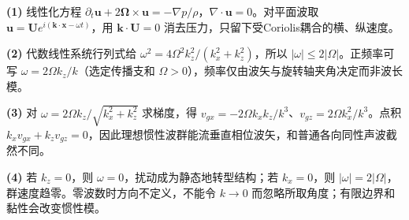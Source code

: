 \par\noindent\textbf{(1)} 线性化方程 \(\partial_t\boldsymbol u+2\boldsymbol\Omega\times\boldsymbol u=-\nabla p/\rho\)，\(\nabla\cdot\boldsymbol u=0\)。对平面波取 \(\boldsymbol u=\boldsymbol Ue^{i(\boldsymbol k\cdot\boldsymbol x-\omega t)}\)，用 \(\boldsymbol k\cdot\boldsymbol U=0\) 消去压力，只留下受Coriolis耦合的横、纵速度。
\par\noindent\textbf{(2)} 代数线性系统行列式给 \(\omega^2=4\Omega^2k_z^2/(k_x^2+k_z^2)\)，所以 \(|\omega|\le2|\Omega|\)。正频率可写 \(\omega=2\Omega k_z/k\)（选定传播支和 \(\Omega>0\)），频率仅由波矢与旋转轴夹角决定而非波长模。
\par\noindent\textbf{(3)} 对 \(\omega=2\Omega k_z/\sqrt{k_x^2+k_z^2}\) 求梯度，得 \(v_{gx}=-2\Omega k_xk_z/k^3\)、\(v_{gz}=2\Omega k_x^2/k^3\)。点积 \(k_xv_{gx}+k_zv_{gz}=0\)，因此理想惯性波群能流垂直相位波矢，和普通各向同性声波截然不同。
\par\noindent\textbf{(4)} 若 \(k_z=0\)，则 \(\omega=0\)，扰动成为静态地转型结构；若 \(k_x=0\)，则 \(|\omega|=2|\Omega|\)，群速度趋零。零波数时方向不定义，不能令 \(k\to0\) 而忽略所取角度；有限边界和黏性会改变惯性模。
